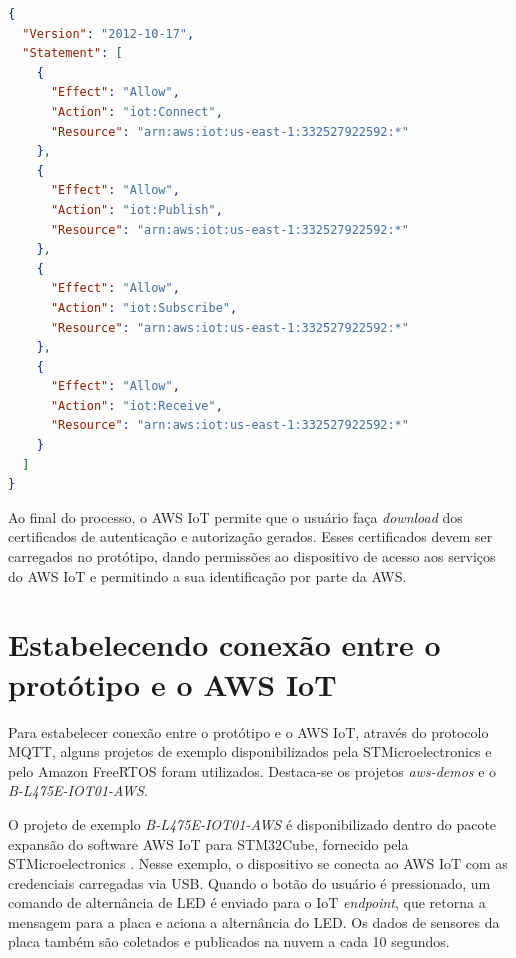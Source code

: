 \begin{lstlisting}[float=htbp,language=json,firstnumber=1,caption={Política dando permissões de conexão, publicação, inscrição, e recebimento de tópicos MQTT ao dispositivo \textit{B-L475E-IOT01A2}.},label=lst:bl475e_policy]
{
  "Version": "2012-10-17",
  "Statement": [
    {
      "Effect": "Allow",
      "Action": "iot:Connect",
      "Resource": "arn:aws:iot:us-east-1:332527922592:*"
    },
    {
      "Effect": "Allow",
      "Action": "iot:Publish",
      "Resource": "arn:aws:iot:us-east-1:332527922592:*"
    },
    {
      "Effect": "Allow",
      "Action": "iot:Subscribe",
      "Resource": "arn:aws:iot:us-east-1:332527922592:*"
    },
    {
      "Effect": "Allow",
      "Action": "iot:Receive",
      "Resource": "arn:aws:iot:us-east-1:332527922592:*"
    }
  ]
}
\end{lstlisting}

Ao final do processo, o AWS IoT permite que o usuário faça \textit{download} dos certificados de autenticação e autorização gerados. Esses certificados devem ser carregados no protótipo, dando permissões ao dispositivo de acesso aos serviços do AWS IoT e permitindo a sua identificação por parte da AWS.

\section{Estabelecendo conexão entre o protótipo e o AWS IoT}\label{section:estabelecendo_conexao_entre_o_prototipo_e_o_aws_iot}

Para estabelecer conexão entre o protótipo e o AWS IoT, através do protocolo MQTT, alguns projetos de exemplo disponibilizados pela STMicroelectronics e pelo Amazon FreeRTOS foram utilizados. Destaca-se os projetos \textit{aws-demos} e o \textit{B-L475E-IOT01-AWS}.

O projeto de exemplo \textit{B-L475E-IOT01-AWS} é disponibilizado dentro do pacote expansão do software AWS IoT para STM32Cube, fornecido pela STMicroelectronics \cite{ref:040}. Nesse exemplo, o dispositivo se conecta ao AWS IoT com as credenciais carregadas via USB. Quando o botão do usuário é pressionado, um comando de alternância de LED é enviado para o IoT \textit{endpoint}, que retorna a mensagem para a placa e aciona a alternância do LED. Os dados de sensores da placa também são coletados e publicados na nuvem a cada 10 segundos.

